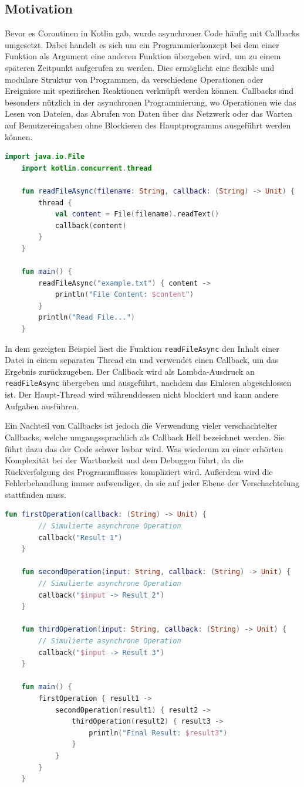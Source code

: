 \documentclass[fontsize=12pt,paper=a4,twoside=semi,parskip=half-,headsepline,headinclude]{scrreprt}
\newcommand{\code}[1]{\texttt{#1}}
\begin{document}
\subsection{Motivation}

Bevor es Coroutinen in Kotlin gab, wurde asynchroner Code häufig mit Callbacks umgesetzt. Dabei handelt es sich um ein Programmierkonzept bei dem einer Funktion als Argument eine anderen Funktion übergeben wird, um zu einem späteren Zeitpunkt aufgerufen zu werden. Dies ermöglicht eine flexible und modulare Struktur von Programmen, da verschiedene Operationen oder Ereignisse mit spezifischen Reaktionen verknüpft werden können. Callbacks sind besonders nützlich in der asynchronen Programmierung, wo Operationen wie das Lesen von Dateien, das Abrufen von Daten über das Netzwerk oder das Warten auf Benutzereingaben ohne Blockieren des Hauptprogramms ausgeführt werden können.

\begin{lstlisting}[language=Kotlin]
	import java.io.File
	import kotlin.concurrent.thread
	
	fun readFileAsync(filename: String, callback: (String) -> Unit) {
		thread {
			val content = File(filename).readText()
			callback(content)
		}
	}
	
	fun main() {
		readFileAsync("example.txt") { content ->
			println("File Content: $content")
		}
		println("Read File...")
	}
\end{lstlisting}

In dem gezeigten Beispiel liest die Funktion \code{readFileAsync} den Inhalt einer Datei in einem separaten Thread ein und verwendet einen Callback, um das Ergebnis zurückzugeben. Der Callback wird als Lambda-Ausdruck an \code{readFileAsync} übergeben und ausgeführt, nachdem das Einlesen abgeschlossen ist. Der Haupt-Thread wird währenddessen nicht blockiert und kann andere Aufgaben ausführen.

Ein Nachteil von Callbacks ist jedoch die Verwendung vieler verschachtelter Callbacks, welche umgangssprachlich als Callback Hell bezeichnet werden. Sie führt dazu das der Code schwer lesbar wird. Was wiederum zu einer erhörten Komplexität bei der Wartbarkeit und dem Debuggen führt, da die Rückverfolgung des Programmflusses kompliziert wird. Außerdem wird die Fehlerbehandlung immer aufwendiger, da sie auf jeder Ebene der Verschachtelung stattfinden muss.

\begin{lstlisting}[language=Kotlin]
	fun firstOperation(callback: (String) -> Unit) {
		// Simulierte asynchrone Operation
		callback("Result 1")
	}
	
	fun secondOperation(input: String, callback: (String) -> Unit) {
		// Simulierte asynchrone Operation
		callback("$input -> Result 2")
	}
	
	fun thirdOperation(input: String, callback: (String) -> Unit) {
		// Simulierte asynchrone Operation
		callback("$input -> Result 3")
	}
	
	fun main() {
		firstOperation { result1 ->
			secondOperation(result1) { result2 ->
				thirdOperation(result2) { result3 ->
					println("Final Result: $result3")
				}
			}
		}
	}
\end{lstlisting}
\end{document}
